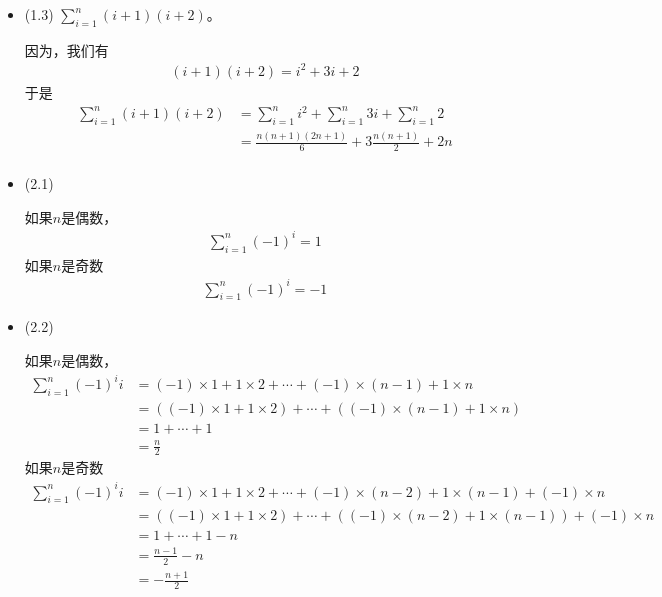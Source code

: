 \documentclass{article}
\begin{document}
\begin{itemize}
      \item (1.3) $\sum\limits_{i = 1}^n (i + 1)(i + 2)$。

            因为，我们有
            \begin{align*}
                  (i + 1)(i + 2) = i^2 + 3i + 2
            \end{align*}
            于是
            \begin{align*}
                  \sum\limits_{i = 1}^n (i + 1)(i + 2)
                   & = \sum\limits_{i = 1}^n i^2 + \sum\limits_{i = 1}^n 3i + \sum\limits_{i = 1}^n 2 \\
                   & = \frac{n(n + 1)(2n + 1)}{6} + 3\frac{n(n + 1)}{2} + 2n                          \\
            \end{align*}

      \item (2.1)

            如果$n$是偶数，
            \begin{align*}
                  \sum\limits_{i = 1}^n (-1)^i = 1
            \end{align*}
            如果$n$是奇数
            \begin{align*}
                  \sum\limits_{i = 1}^n (-1)^i = -1
            \end{align*}

      \item (2.2)

            如果$n$是偶数，
            \begin{align*}
                  \sum\limits_{i = 1}^n (-1)^i i
                   & = (-1) \times 1 + 1 \times 2 + \cdots + (-1) \times (n - 1) + 1 \times n     \\
                   & = ((-1) \times 1 + 1 \times 2) + \cdots + ((-1) \times (n - 1) + 1 \times n) \\
                   & = 1 + \cdots + 1                                                             \\
                   & = \frac{n}{2}
            \end{align*}
            如果$n$是奇数
            \begin{align*}
                  \sum\limits_{i = 1}^n (-1)^i i
                   & = (-1) \times 1 + 1 \times 2 + \cdots + (-1) \times (n - 2) + 1 \times (n - 1) + (-1) \times n     \\
                   & = ((-1) \times 1 + 1 \times 2) + \cdots + ((-1) \times (n - 2) + 1 \times (n - 1)) + (-1) \times n \\
                   & = 1 + \cdots + 1 - n                                                                               \\
                   & = \frac{n - 1}{2} - n                                                                              \\
                   & = - \frac{n + 1}{2}
            \end{align*}
\end{itemize}
\end{document}
